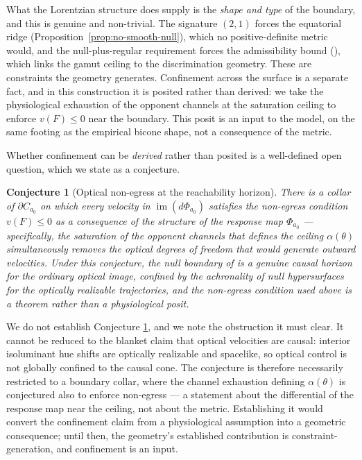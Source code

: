 \documentclass[preprint,12pt,authoryear]{elsarticle}
\theoremstyle{plain}
\newtheorem{conjecture}[theorem]{Conjecture}
\theoremstyle{definition}
\theoremstyle{remark}
\begin{document}
What the Lorentzian structure does supply is the \emph{shape and type} of the boundary, and this is genuine and non-trivial. The signature $(2,1)$ forces the equatorial ridge (Proposition~\ref{prop:no-smooth-null}), which no positive-definite metric would, and the null-plus-regular requirement forces the admissibility bound (), which links the gamut ceiling to the discrimination geometry. These are constraints the geometry generates. Confinement across the surface is a separate fact, and in this construction it is posited rather than derived: we take the physiological exhaustion of the opponent channels at the saturation ceiling to enforce $v(F)\leq 0$ near the boundary. This posit is an input to the model, on the same footing as the empirical bicone shape, not a consequence of the metric.

Whether confinement can be \emph{derived} rather than posited is a well-defined open question, which we state as a conjecture.

\begin{conjecture}[Optical non-egress at the reachability horizon]
\label{conj:optical-egress}
There is a collar of $\partial C_{a_0}$ on which every velocity in $\operatorname{im}(d\Phi_{a_0})$ satisfies the non-egress condition $v(F)\leq 0$ as a consequence of the structure of the response map $\Phi_{a_0}$ --- specifically, the saturation of the opponent channels that defines the ceiling $\alpha(\theta)$ simultaneously removes the optical degrees of freedom that would generate outward velocities. Under this conjecture, the null boundary of  is a genuine causal horizon for the ordinary optical image, confined by the achronality of null hypersurfaces for the optically realizable trajectories, and the non-egress condition used above is a theorem rather than a physiological posit.
\end{conjecture}

We do not establish Conjecture \ref{conj:optical-egress}, and we note the obstruction it must clear. It cannot be reduced to the blanket claim that optical velocities are causal: interior isoluminant hue shifts are optically realizable and spacelike, so optical control is not globally confined to the causal cone. The conjecture is therefore necessarily restricted to a boundary collar, where the channel exhaustion defining $\alpha(\theta)$ is conjectured also to enforce non-egress --- a statement about the differential of the response map near the ceiling, not about the metric. Establishing it would convert the confinement claim from a physiological assumption into a geometric consequence; until then, the geometry's established contribution is constraint-generation, and confinement is an input.
\end{document}
